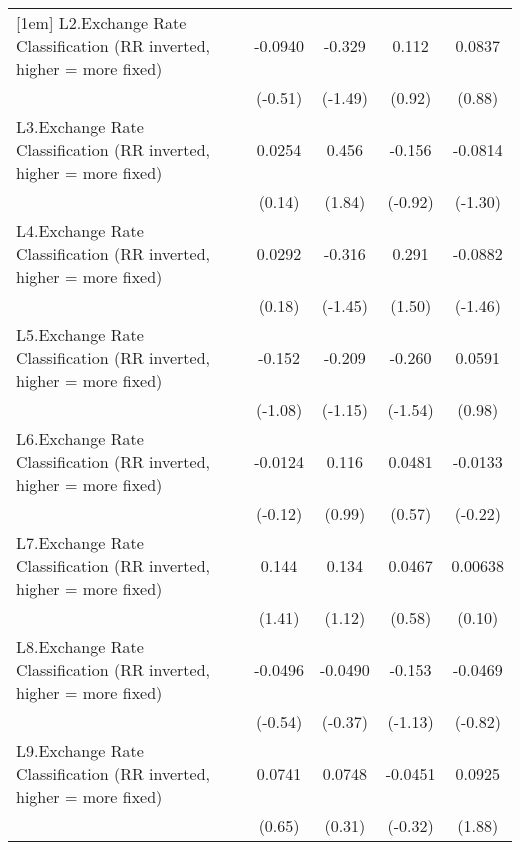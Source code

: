 {\begin{tabular}{l*{4}{c}}
[1em]
L2.Exchange Rate Classification (RR inverted, higher = more fixed)&  -0.0940         &   -0.329         &    0.112         &   0.0837         \\
                &  (-0.51)         &  (-1.49)         &   (0.92)         &   (0.88)         \\
[1em]
L3.Exchange Rate Classification (RR inverted, higher = more fixed)&   0.0254         &    0.456         &   -0.156         &  -0.0814         \\
                &   (0.14)         &   (1.84)         &  (-0.92)         &  (-1.30)         \\
[1em]
L4.Exchange Rate Classification (RR inverted, higher = more fixed)&   0.0292         &   -0.316         &    0.291         &  -0.0882         \\
                &   (0.18)         &  (-1.45)         &   (1.50)         &  (-1.46)         \\
[1em]
L5.Exchange Rate Classification (RR inverted, higher = more fixed)&   -0.152         &   -0.209         &   -0.260         &   0.0591         \\
                &  (-1.08)         &  (-1.15)         &  (-1.54)         &   (0.98)         \\
[1em]
L6.Exchange Rate Classification (RR inverted, higher = more fixed)&  -0.0124         &    0.116         &   0.0481         &  -0.0133         \\
                &  (-0.12)         &   (0.99)         &   (0.57)         &  (-0.22)         \\
[1em]
L7.Exchange Rate Classification (RR inverted, higher = more fixed)&    0.144         &    0.134         &   0.0467         &  0.00638         \\
                &   (1.41)         &   (1.12)         &   (0.58)         &   (0.10)         \\
[1em]
L8.Exchange Rate Classification (RR inverted, higher = more fixed)&  -0.0496         &  -0.0490         &   -0.153         &  -0.0469         \\
                &  (-0.54)         &  (-0.37)         &  (-1.13)         &  (-0.82)         \\
[1em]
L9.Exchange Rate Classification (RR inverted, higher = more fixed)&   0.0741         &   0.0748         &  -0.0451         &   0.0925         \\
                &   (0.65)         &   (0.31)         &  (-0.32)         &   (1.88)         \\

\end{tabular}}

